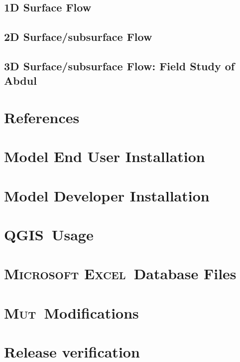\documentclass[12pt,oneside,openany]{book}
\newcommand{\vstudio}{\textsc{Microsoft Visual Studio}}
\newcommand{\excel}{\textsc{Microsoft Excel}}
\newcommand{\mut}{\textsc{Mut}}
\newcommand{\github}{\textsc{GitHub}}
\newcommand{\qgis}{\textsc{QGIS}}
\begin{document}
    \section{1D Surface Flow} 
    \section{2D Surface/subsurface Flow} 
    \section{3D Surface/subsurface Flow: Field Study of Abdul}

\chapter{References}

\appendix

\chapter{Model End User Installation}
\chapter{Model Developer Installation}
\chapter{\qgis\ Usage}
\chapter{\excel\ Database Files}
\chapter{\mut\ Modifications}
\chapter{Release verification}



\printindex
\newpage

%
%
\end{document}

